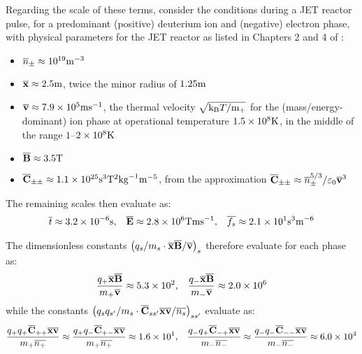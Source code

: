     Regarding the scale of these terms, consider the conditions during a JET reactor pulse, for a predominant (positive) deuterium  ion and (negative) electron phase, with physical parameters for the JET reactor as listed in Chapters 2 and 4 of \cite{Wes00}:
    \begin{itemize}
        \item  $\overline{n}_{\pm}        \approx  10^{19}\mathrm{m}^{- 3}$
        \item  $\overline{\mathbf{x}}           \approx  2.5\mathrm{m}$, twice the minor radius of $1.25\mathrm{m}$
        \item  $\overline{\mathbf{v}}           \approx  7.9\times 10^{5}\mathrm{m}\mathrm{s}^{- 1}$, the thermal velocity $\sqrt{\mathrm{k}_{\mathrm{B}}T/\mathrm{m}_{+}}$ for the (mass/energy-dominant) ion phase at operational temperature $1.5\times 10^{8}\mathrm{K}$, in the middle of the range $1$–$2\times 10^{8}\mathrm{K}$
        \item  $\overline{\mathbf{B}}           \approx  3.5\mathrm{T}$
        \item  $\overline{\mathbf{C}}_{\pm\pm}  \approx  1.1\times 10^{25}\mathrm{s}^{3}\mathrm{T}^{2}{\rm kg}^{- 1}\mathrm{m}^{- 5}$, from the approximation $\overline{\mathbf{C}}_{\pm\pm}  \approx  \overline{n}_{\pm}^{5/3}/\varepsilon_{0}\overline{\mathbf{v}}^{3}$ 
    \end{itemize}
    The remaining scales then evaluate as:
    \begin{align}
        \overline{t}      \approx  3.2\times 10^{- 6}\mathrm{s},              &&
        \overline{\mathbf{E}}   \approx  2.8\times 10^{6}\mathrm{T}\mathrm{m}\mathrm{s}^{- 1},  &&
        \overline{f_{s}}  \approx  2.1\times 10^{1}\mathrm{s}^{3}\mathrm{m}^{- 6}
    \end{align}
    
    
    The dimensionless constants $\left(q_{s}/m_{s}\cdot\overline{\mathbf{x}}\overline{\mathbf{B}}/\overline{\mathbf{v}}\right)_{s}$ therefore evaluate for each phase as:
    \begin{align}
        \frac{q_{+}\overline{\mathbf{x}}\overline{\mathbf{B}}}{m_{+}\overline{\mathbf{v}}}  \approx  5.3\times 10^{2},  &&
        \frac{q_{-}\overline{\mathbf{x}}\overline{\mathbf{B}}}{m_{-}\overline{\mathbf{v}}}  \approx  2.0\times 10^{6}
    \end{align}
    while the constants $\left(q_{s}q_{s'}/m_{s}\cdot\overline{\mathbf{C}}_{ss'}\overline{\mathbf{x}}\overline{\mathbf{v}}/\overline{n_{s}}\right)_{ss'}$ evaluate as:
    \begin{align}
        \frac{q_{+}q_{+}\overline{\mathbf{C}}_{++}\overline{\mathbf{x}}\overline{\mathbf{v}}}{m_{+}\overline{n_{+}}}  \approx  \frac{q_{+}q_{-}\overline{\mathbf{C}}_{+-}\overline{\mathbf{x}}\overline{\mathbf{v}}}{m_{+}\overline{n_{+}}}  \approx  1.6\times 10^{1},  &&
        \frac{q_{-}q_{+}\overline{\mathbf{C}}_{-+}\overline{\mathbf{x}}\overline{\mathbf{v}}}{m_{-}\overline{n_{-}}}  \approx  \frac{q_{-}q_{-}\overline{\mathbf{C}}_{--}\overline{\mathbf{x}}\overline{\mathbf{v}}}{m_{-}\overline{n_{-}}}  \approx   6.0\times 10^{4}
    \end{align}
    
